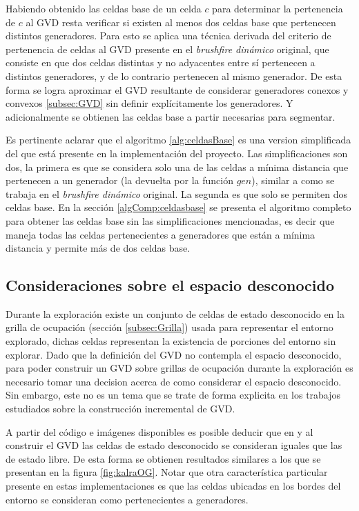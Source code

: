 
Habiendo obtenido las celdas base de un celda $c$ para determinar la
pertenencia de $c$ al GVD resta verificar si existen al menos dos celdas base
que pertenecen distintos generadores. Para esto se aplica una técnica derivada
del criterio de pertenencia de celdas al GVD presente en el \emph{brushfire dinámico}
original, que consiste en que dos celdas distintas y no adyacentes entre
sí pertenecen a distintos generadores, y de lo contrario pertenecen al mismo
generador. De esta forma se logra aproximar el GVD resultante de considerar
generadores conexos y convexos \ref{subsec:GVD} sin definir explícitamente los
generadores. Y adicionalmente se obtienen las celdas base a partir necesarias
para segmentar.

Es pertinente aclarar que el algoritmo \ref{alg:celdasBase} es una version
simplificada del que está presente en la implementación del proyecto. Las
simplificaciones son dos, la primera es que se considera solo una de las celdas
a mínima distancia que pertenecen a un generador (la devuelta por la función
$gen$), similar a como se trabaja en el \emph{brushfire dinámico} original. La
segunda es que solo se permiten dos celdas base. En la sección
\ref{algComp:celdasbase} se presenta el algoritmo completo para obtener las
celdas base sin las simplificaciones mencionadas, es decir que maneja todas las
celdas pertenecientes a generadores que están a mínima distancia y permite más
de dos celdas base.

\subsection{Consideraciones sobre el espacio desconocido}\label{subsec:espDesc}

Durante la exploración existe un conjunto de celdas de estado desconocido en la
grilla de ocupación (sección \ref{subsec:Grilla}) usada para representar el
entorno explorado, dichas celdas representan la existencia de porciones del
entorno sin explorar. Dado que la definición del GVD no contempla el espacio
desconocido, para poder construir un GVD sobre grillas de ocupación durante la
exploración es necesario tomar una decision acerca de como considerar el 
espacio desconocido. Sin embargo, este no es un tema que se trate de forma
explicita en los trabajos estudiados sobre la construcción incremental de GVD. 

A partir del código e imágenes disponibles es posible deducir que en
\cite{kalra2009incremental} y \cite{Lau2013} al construir el GVD las celdas de
estado desconocido se consideran iguales que las de estado libre. De esta
forma se obtienen resultados similares a los que se presentan en la figura
\ref{fig:kalraOG}. Notar que otra característica particular presente en estas
implementaciones es que las celdas ubicadas en los bordes del entorno se
consideran como pertenecientes a generadores.

